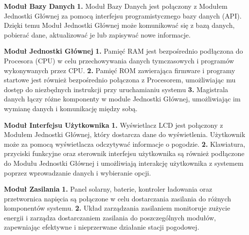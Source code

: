 \documentclass{article}
\begin{document}
\begin{flushleft}
    \Large \textbf{Moduł Bazy Danych} \newline \newline
    \large
    \textbf{1.} Moduł Bazy Danych jest połączony z Modułem Jednostki Głównej za pomocą interfejsu programistycznego bazy danych (API). Dzięki temu Moduł Jednostki Głównej może komunikować się z bazą danych, pobierać dane, aktualizować je lub zapisywać nowe informacje. \newline \newline
\end{flushleft} 
\begin{flushleft}
    \Large \textbf{Moduł Jednostki Głównej} \newline \newline
    \large
    \textbf{1.} Pamięć RAM jest bezpośrednio podłączona do Procesora (CPU) w celu przechowywania danych tymczasowych i programów wykonywanych przez CPU. \newline \newline
    \textbf{2.} Pamięć ROM zawierająca firmware i programy startowe jest również bezpośrednio połączona z Procesorem, umożliwiając mu dostęp do niezbędnych instrukcji przy uruchamianiu systemu \newline \newline
    \textbf{3.} Magistrala danych łączy różne komponenty w module Jednostki Głównej, umożliwiając im wymianę danych i komunikację między sobą. \newline \newline
\end{flushleft}
\begin{flushleft}
    \Large \textbf{Moduł Interfejsu Użytkownika} \newline \newline
    \large
    \textbf{1.} Wyświetlacz LCD jest połączony z Modułem Jednostki Głównej, który dostarcza dane do wyświetlenia. Użytkownik może za pomocą wyświetlacza odczytywać informacje o pogodzie. \newline \newline
    \textbf{2.} Klawiatura, przyciski funkcyjne oraz sterownik interfejsu użytkownika są również podłączone do Modułu Jednostki Głównej i umożliwiają interakcję użytkownika z systemem poprzez wprowadzanie danych i wybieranie opcji. \newline \newline
\end{flushleft}
\begin{flushleft}
    \Large \textbf{Moduł Zasilania} \newline \newline
    \large
    \textbf{1.} Panel solarny, baterie, kontroler ładowania oraz przetwornica napięcia są połączone w celu dostarczania zasilania do różnych komponentów systemu. \newline \newline
    \textbf{2.} Układ zarządzania zasilaniem monitoruje zużycie energii i zarządza dostarczaniem zasilania do poszczególnych modułów, zapewniając efektywne i nieprzerwane działanie stacji pogodowej. \newline \newline
\end{flushleft}
\end{document}
